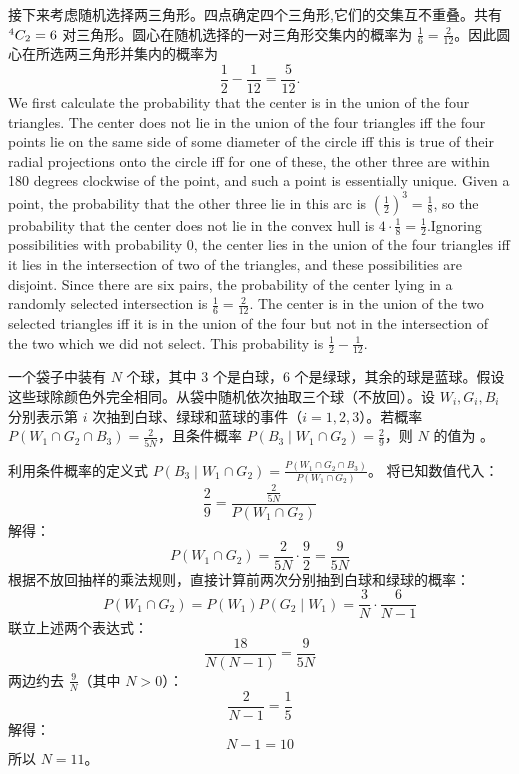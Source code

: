 \begin{questions}
\begin{solution}
接下来考虑随机选择两三角形。四点确定四个三角形,它们的交集互不重叠。共有 ${}^{4}C_{2} = 6$ 对三角形。圆心在随机选择的一对三角形交集内的概率为 $\frac{1}{6} = \frac{2}{12}$。因此圆心在所选两三角形并集内的概率为
\[
\frac{1}{2} - \frac{1}{12} = \frac{5}{12}.
\]
We first calculate the probability that the center is in the union of the four triangles. The center does not lie in the union of the four triangles iff the four points lie on the same side of some diameter of the circle iff this is true of their radial projections onto the circle iff for one of these, the other three are within 180 degrees clockwise of the point, and such a point is essentially unique. Given a point, the probability that the other three lie in this arc is $\left(\frac{1}{2}\right)^3=\frac{1}{8}$, so the probability that the center does not lie in the convex hull is $4 \cdot \frac{1}{8}=\frac{1}{2}$.Ignoring possibilities with probability 0, the center lies in the union of the four triangles iff it lies in the intersection of two of the triangles, and these possibilities are disjoint. Since there are six pairs, the probability of the center lying in a randomly selected intersection is $\frac{1}{6} = \frac{2}{12}$. The center is in the union of the two selected triangles iff it is in the union of the four but not in the intersection of the two which we did not select. This probability is $\frac{1}{2} - \frac{1}{12}$.
\end{solution}

\question 一个袋子中装有 $N$ 个球，其中 3 个是白球，6 个是绿球，其余的球是蓝球。假设这些球除颜色外完全相同。从袋中随机依次抽取三个球（不放回）。设 $W_i, G_i, B_i$ 分别表示第 $i$ 次抽到白球、绿球和蓝球的事件（$i = 1, 2, 3$）。若概率 $P(W_1 \cap G_2 \cap B_3) = \frac{2}{5N}$，且条件概率 $P(B_3 \mid W_1 \cap G_2) = \frac{2}{9}$，则 $N$ 的值为 \underline{\hspace{2cm}}。

\begin{solution}
利用条件概率的定义式 $P(B_3 \mid W_1 \cap G_2) = \frac{P(W_1 \cap G_2 \cap B_3)}{P(W_1 \cap G_2)}$。
将已知数值代入：
\[
\frac{2}{9} = \frac{\frac{2}{5N}}{P(W_1 \cap G_2)}
\]
解得：
\[
P(W_1 \cap G_2) = \frac{2}{5N} \cdot \frac{9}{2} = \frac{9}{5N}
\]
根据不放回抽样的乘法规则，直接计算前两次分别抽到白球和绿球的概率：
\[
P(W_1 \cap G_2) = P(W_1) P(G_2 \mid W_1) = \frac{3}{N} \cdot \frac{6}{N-1}
\]
联立上述两个表达式：
\[
\frac{18}{N(N-1)} = \frac{9}{5N}
\]
两边约去 $\frac{9}{N}$（其中 $N > 0$）：
\[
\frac{2}{N-1} = \frac{1}{5}
\]
解得：
\[
N - 1 = 10
\]
所以 $N = 11$。
\end{solution}


\end{questions}
